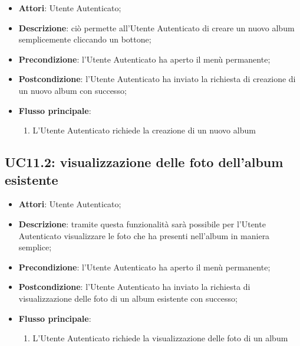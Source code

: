 \begin{itemize}
  \item \textbf{Attori}: Utente Autenticato;
  \item \textbf{Descrizione}: ciò permette all'Utente Autenticato di creare un
nuovo album semplicemente cliccando un bottone;
  \item \textbf{Precondizione}: l'Utente Autenticato ha aperto il menù
permanente;
  \item \textbf{Postcondizione}: l'Utente Autenticato ha inviato la richiesta
di creazione di un nuovo album con successo;
  \item \textbf{Flusso principale}:
  \begin{enumerate}
    \item L'Utente Autenticato richiede la creazione di un nuovo album
  \end{enumerate}
\end{itemize}



\subsection{UC11.2: visualizzazione delle foto dell'album esistente}
\label{uc:uc11.2}
\hypertarget{UC11.2}{}

\begin{itemize}
  \item \textbf{Attori}: Utente Autenticato;
  \item \textbf{Descrizione}: tramite questa funzionalità sarà possibile per
l'Utente Autenticato visualizzare le foto che ha presenti nell'album in maniera
semplice;
  \item \textbf{Precondizione}: l'Utente Autenticato ha aperto il menù
permanente;
  \item \textbf{Postcondizione}: l'Utente Autenticato ha inviato la richiesta
di visualizzazione delle foto di un album esistente con successo;
  \item \textbf{Flusso principale}:
  \begin{enumerate}
    \item L'Utente Autenticato richiede la visualizzazione delle foto di un
album
  \end{enumerate}
\end{itemize}


%

